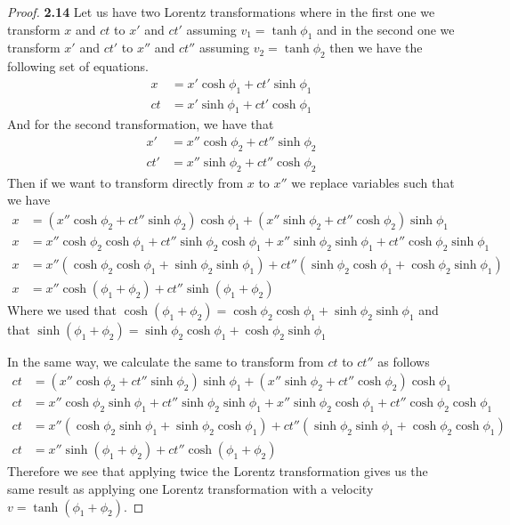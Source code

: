 \documentclass[11pt]{article}
\theoremstyle{definition}
\begin{document}
	\begin{proof}{\textbf{2.14}}
        Let us have two Lorentz transformations where in the first one we transform $x$
        and $ct$ to $x'$ and $ct'$ assuming $v_1 = \tanh\phi_1$ and in the second one
        we transform $x'$ and $ct'$ to $x''$ and $ct''$ assuming $v_2 = \tanh\phi_2$ 
        then we have the following set of equations.
        \begin{align*}
            x &= x'\cosh\phi_1 + ct'\sinh\phi_1\\
            ct &= x'\sinh\phi_1 + ct'\cosh\phi_1
        \end{align*}
        And for the second transformation, we have that
        \begin{align*}
            x' &= x''\cosh\phi_2 + ct''\sinh\phi_2\\
            ct' &= x''\sinh\phi_2 + ct''\cosh\phi_2
        \end{align*}
        Then if we want to transform directly from $x$ to $x''$ we replace variables
        such that we have
        \begin{align*}
            x &= (x''\cosh\phi_2 + ct''\sinh\phi_2)\cosh\phi_1 +
            (x''\sinh\phi_2 + ct''\cosh\phi_2)\sinh\phi_1\\
            x &= x''\cosh\phi_2\cosh\phi_1 + ct''\sinh\phi_2\cosh\phi_1 +
            x''\sinh\phi_2\sinh\phi_1 + ct''\cosh\phi_2\sinh\phi_1\\
            x &= x''(\cosh\phi_2\cosh\phi_1 + \sinh\phi_2\sinh\phi_1) +
            ct''(\sinh\phi_2\cosh\phi_1 + \cosh\phi_2\sinh\phi_1)\\
            x &= x''\cosh(\phi_1 + \phi_2) + ct''\sinh(\phi_1 + \phi_2)
        \end{align*}
        Where we used that $\cosh(\phi_1 + \phi_2) = \cosh\phi_2\cosh\phi_1 + \sinh\phi_2\sinh\phi_1$
        and that $\sinh(\phi_1 + \phi_2) = \sinh\phi_2\cosh\phi_1 + \cosh\phi_2\sinh\phi_1$

        In the same way, we calculate the same to transform from $ct$ to $ct''$ as
        follows
        \begin{align*}
            ct &= (x''\cosh\phi_2 + ct''\sinh\phi_2)\sinh\phi_1 +
            (x''\sinh\phi_2 + ct''\cosh\phi_2)\cosh\phi_1\\
            ct &= x''\cosh\phi_2\sinh\phi_1 + ct''\sinh\phi_2\sinh\phi_1 +
            x''\sinh\phi_2\cosh\phi_1 + ct''\cosh\phi_2\cosh\phi_1\\
            ct &= x''(\cosh\phi_2\sinh\phi_1 + \sinh\phi_2\cosh\phi_1) +
            ct''(\sinh\phi_2\sinh\phi_1 + \cosh\phi_2\cosh\phi_1)\\
            ct &= x''\sinh(\phi_1 + \phi_2) + ct''\cosh(\phi_1 + \phi_2)
        \end{align*}
        Therefore we see that applying twice the Lorentz transformation gives us the same
        result as applying one Lorentz transformation with a velocity\\
        $v = \tanh(\phi_1 + \phi_2)$.
    \end{proof}
\end{document}
